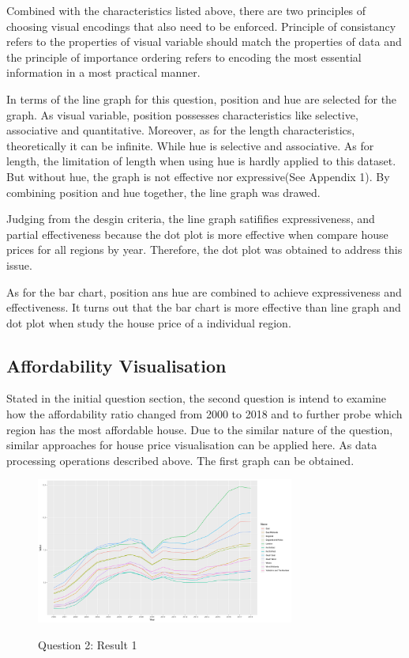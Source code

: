\documentclass{article}
\begin{document}
Combined with the characteristics listed above, there are two principles of choosing visual encodings that 
also need to be enforced. Principle of consistancy refers to the properties of visual variable should match 
the properties of data and the principle of importance ordering refers to encoding the most essential information 
in a most practical manner.

In terms of the line graph for this question, position and hue are selected for the graph. As visual variable, 
position possesses characteristics like selective, associative and quantitative. Moreover, as for 
the length characteristics, theoretically it can be infinite. While hue is selective and associative. As for length, 
the limitation of length when using hue is hardly applied to this dataset. But without hue, the graph is not 
effective nor expressive(See Appendix 1). By combining position and hue together, the line graph was drawed. 

Judging from the desgin criteria, the line graph satififies expressiveness, and partial effectiveness because 
the dot plot is more effective when compare house prices for all regions by year. Therefore, the dot plot was 
obtained to address this issue.

As for the bar chart, position ans hue are combined to achieve expressiveness and effectiveness. It turns out 
that the bar chart is more effective than line graph and dot plot when study the house price of a individual region.




\subsection{Affordability Visualisation}
Stated in the initial question section, the second question is intend to examine how the affordability ratio changed from 2000 to 2018 
and to further probe which region has the most affordable house. Due to the similar nature of the question, 
similar approaches for house price visualisation can be applied here. As data processing operations described above. 
The first graph can be obtained.

\begin{figure}[H]
  \begin{minipage}[b]{1.0\linewidth}
    \centering
    \centerline{\includegraphics[width=8.5cm]{Q2Geom_line}}
    \centerline{Question 2: Result 1}\medskip
  \end{minipage}
\end{figure}
\end{document}
